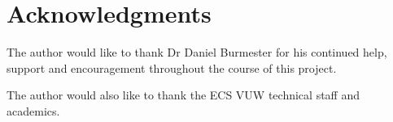 \chapter*{Acknowledgments}\label{C:ack} 

The author would like to thank Dr Daniel Burmester for his continued help, support and encouragement throughout the course of this project.

The author would also like to thank the ECS VUW technical staff and academics.
